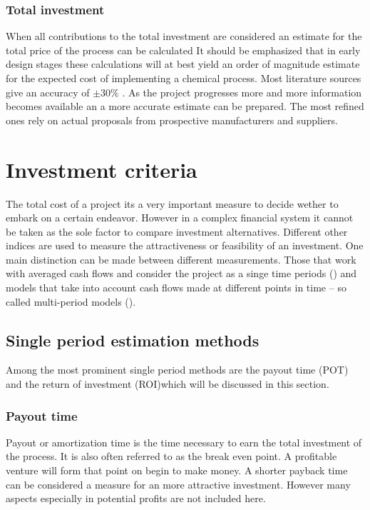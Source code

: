     \subsubsection{Total investment}
        When all contributions to the total investment are considered an estimate for the total price of the
        process can be calculated
        It should be emphasized that in early design stages these calculations will at best yield an order of
        magnitude estimate for the expected cost of implementing a chemical process. Most literature sources
        give an accuracy of $\pm 30 \%$  \cite{Peters.2003}. As the project progresses more and more information
        becomes available an a more accurate estimate can be prepared. The most refined ones rely on actual
        proposals from prospective manufacturers and suppliers.


\section{Investment criteria}
\label{sec:InvestmentCriteria}
    The total cost of a project its a very important measure to decide wether to embark on a certain endeavor.
    However in a complex financial system it cannot be taken as the sole factor to compare investment
    alternatives. Different other indices are used to measure the attractiveness or feasibility of an investment. One
    main distinction can be made between different measurements. Those that work with averaged cash flows
    and consider the project as a singe time periods () and models that take into
    account cash flows made at different points in time -- so called multi-period models ().


    \subsection{Single period estimation methods}
    \label{sec:SinglePeriod}
        Among the most prominent single period methods are the payout time (POT) and the return of
        investment (ROI)which will be discussed in this section.

        \subsubsection{Payout time}
            Payout or amortization  time is the time necessary to earn the total investment of the process. It is also
            often referred to as the break even point. A profitable venture will form that point on begin to make money.
            A shorter payback time can be considered a measure for an more attractive investment.
            However many aspects especially in potential profits are not included here.

